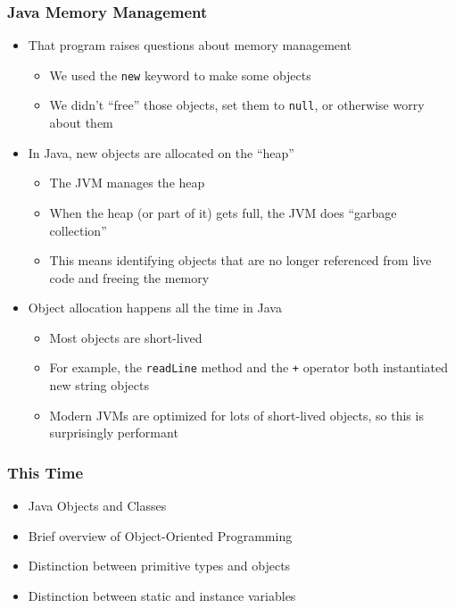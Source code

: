 \documentclass{beamer}
\begin{document}
\begin{frame}
\frametitle{Java Memory Management}
\begin{itemize}
\item That program raises questions about memory management
\begin{itemize}
\item We used the \texttt{new} keyword to make some objects
\item We didn't ``free'' those objects, set them to \texttt{null}, or otherwise worry about them
\end{itemize}
\item In Java, new objects are allocated on the ``heap''
\begin{itemize}
\item The JVM manages the heap
\item When the heap (or part of it) gets full, the JVM does ``garbage collection''
\item This means identifying objects that are no longer referenced from live code and freeing the memory
\end{itemize}
\item Object allocation happens all the time in Java
\begin{itemize}
\item Most objects are short-lived
\item For example, the \texttt{readLine} method and the \texttt{+} operator both instantiated new string objects
\item Modern JVMs are optimized for lots of short-lived objects, so this is surprisingly performant
\end{itemize}
\end{itemize}
\end{frame}

\begin{frame}
\frametitle{This Time}
\begin{itemize}
\item Java Objects and Classes
\item Brief overview of Object-Oriented Programming
\item Distinction between primitive types and objects
\item Distinction between static and instance variables
\end{itemize}
\end{frame}
\end{document}
